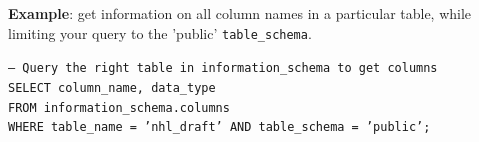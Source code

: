 \documentclass[11pt]{article}
\begin{document}
    \vspace{5mm}

    \textbf{Example}: get information on all column names in a particular table, while limiting your query to the 'public' \texttt{table\_schema}.

    \vspace{5mm}

    \texttt{-- Query the right table in information\_schema to get columns \\
    SELECT column\_name, data\_type \\
    FROM information\_schema.columns \\
    WHERE table\_name = 'nhl\_draft' AND table\_schema = 'public';}

    \medskip
    
    
\end{document}
